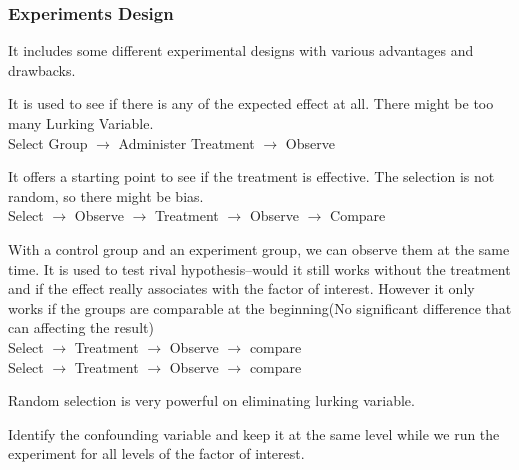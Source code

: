 \subsubsection{Experiments Design}
It includes some different experimental designs with various advantages and drawbacks.


\begin{center}
\end{center}
It is used to see if there is any of the expected effect at all. There might be too many Lurking Variable.\\Select Group $\rightarrow$ Administer Treatment $\rightarrow$ Observe
\vspace{3ex}
\begin{center}
\end{center}
It offers a starting point to see if the treatment is effective. The selection is not random, so there might be bias.\\ Select $\rightarrow$ Observe $\rightarrow$ Treatment $\rightarrow$ Observe $\rightarrow$ Compare
\vspace{3ex}
\begin{center}
\end{center}
With a control group and an experiment group, we can observe them at the same time. It is used to test rival hypothesis--would it still works without the treatment and if the effect really associates with the factor of interest. However it only works if the groups are comparable at the beginning(No significant difference that can affecting the result)\\ Select $\rightarrow$ Treatment $\rightarrow$ Observe $\rightarrow$ compare\\Select $\rightarrow$ Treatment $\rightarrow$ Observe $\rightarrow$ compare
\vspace{3ex}
\begin{center}
\end{center}
Random selection is very powerful on eliminating lurking variable.
\vspace{3ex}
\begin{center}
\end{center}
Identify the confounding variable and keep it at the same level while we run the experiment for all levels of the factor of interest.
\vspace{3ex}
\begin{center}
\end{center}
